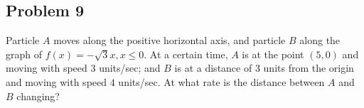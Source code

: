 \subsection*{Problem 9}
Particle $A$ moves along the positive horizontal axis, and particle
$B$ along the graph of $f(x)=-\sqrt{3}x,x\leq0$. At a certain time,
$A$ is at the point $(5,0)$ and moving with speed $3$ units/sec; and
$B$ is at a distance of 3 units from the origin and moving with speed
$4$ units/sec. At what rate is the distance between $A$ and $B$
changing?

